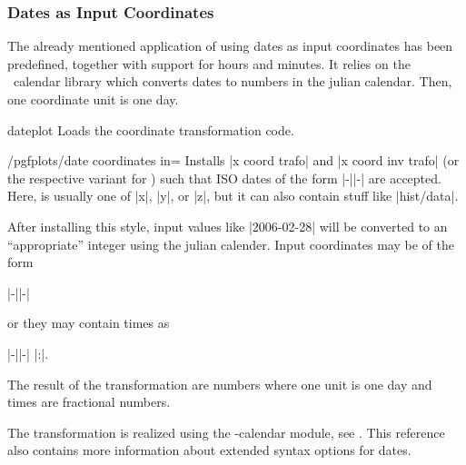 \subsubsection{Dates as Input Coordinates}
\label{pgfplots:sec:date:coords}
The already mentioned application of using dates as input coordinates has been predefined, together with support for hours and minutes. It relies on the \pgfname\ calendar library which converts dates to numbers in the julian calendar. Then, one coordinate unit is one day.

\begin{pgfplotslibrary}{dateplot}
	Loads the coordinate transformation code.
\end{pgfplotslibrary}

\begin{stylekey}{/pgfplots/date coordinates in=}
	Installs |x coord trafo| and |x coord inv trafo| (or the respective variant for ) such that ISO dates of the form |-||-| are accepted. Here,  is usually one of |x|, |y|, or |z|, but it can also contain stuff like |hist/data|.
	
	After installing this style, input values like |2006-02-28| will be converted to an ``appropriate'' integer using the julian calender. Input coordinates may be of the form
		
		|-||-|

	\noindent or they may contain times as

		|-||-| |:|.

	The result of the transformation are numbers where one unit is one day and times are fractional numbers.

	The transformation is realized using the \pgfname-calendar module, see \cite[Calendar Library]{tikz}. This reference also contains more information about extended syntax options for dates.


\end{stylekey}
